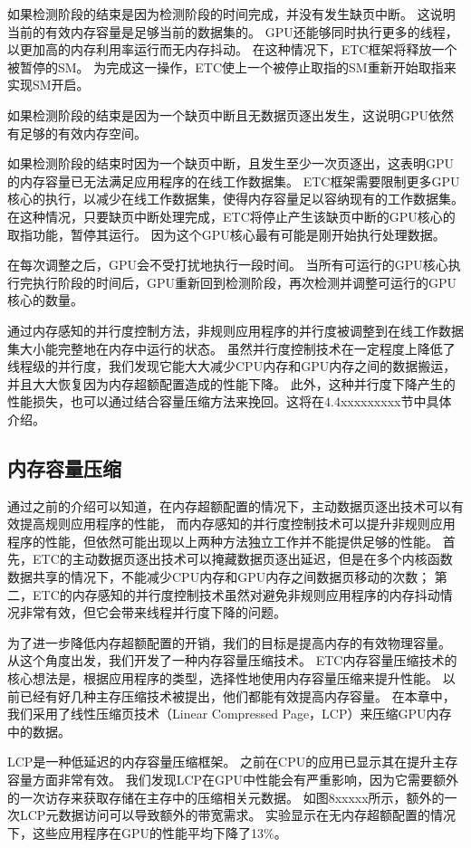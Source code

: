 如果检测阶段的结束是因为检测阶段的时间完成，并没有发生缺页中断。
这说明当前的有效内存容量是足够当前的数据集的。
GPU还能够同时执行更多的线程，以更加高的内存利用率运行而无内存抖动。
在这种情况下，ETC框架将释放一个被暂停的SM。
为完成这一操作，ETC使上一个被停止取指的SM重新开始取指来实现SM开启。

如果检测阶段的结束是因为一个缺页中断且无数据页逐出发生，这说明GPU依然有足够的有效内存空间。

如果检测阶段的结束时因为一个缺页中断，且发生至少一次页逐出，这表明GPU的内存容量已无法满足应用程序的在线工作数据集。
ETC框架需要限制更多GPU核心的执行，以减少在线工作数据集，使得内存容量足以容纳现有的工作数据集。
在这种情况，只要缺页中断处理完成，ETC将停止产生该缺页中断的GPU核心的取指功能，暂停其运行。
因为这个GPU核心最有可能是刚开始执行处理数据。

在每次调整之后，GPU会不受打扰地执行一段时间。
当所有可运行的GPU核心执行完执行阶段的时间后，GPU重新回到检测阶段，再次检测并调整可运行的GPU核心的数量。

通过内存感知的并行度控制方法，非规则应用程序的并行度被调整到在线工作数据集大小能完整地在内存中运行的状态。
虽然并行度控制技术在一定程度上降低了线程级的并行度，我们发现它能大大减少CPU内存和GPU内存之间的数据搬运，并且大大恢复因为内存超额配置造成的性能下降。
此外，这种并行度下降产生的性能损失，也可以通过结合容量压缩方法来挽回。这将在4.4xxxxxxxxx节中具体介绍。

\subsection{内存容量压缩}
通过之前的介绍可以知道，在内存超额配置的情况下，主动数据页逐出技术可以有效提高规则应用程序的性能，
而内存感知的并行度控制技术可以提升非规则应用程序的性能，但依然可能出现以上两种方法独立工作并不能提供足够的性能。
首先，ETC的主动数据页逐出技术可以掩藏数据页逐出延迟，但是在多个内核函数数据共享的情况下，不能减少CPU内存和GPU内存之间数据页移动的次数；
第二，ETC的内存感知的并行度控制技术虽然对避免非规则应用程序的内存抖动情况非常有效，但它会带来线程并行度下降的问题。

为了进一步降低内存超额配置的开销，我们的目标是提高内存的有效物理容量。
从这个角度出发，我们开发了一种内存容量压缩技术。
ETC内存容量压缩技术的核心想法是，根据应用程序的类型，选择性地使用内存容量压缩来提升性能。
以前已经有好几种主存压缩技术被提出，他们都能有效提高内存容量。
在本章中，我们采用了线性压缩页技术（Linear Compressed Page，LCP）来压缩GPU内存中的数据。

LCP是一种低延迟的内存容量压缩框架。
之前在CPU的应用已显示其在提升主存容量方面非常有效。
我们发现LCP在GPU中性能会有严重影响，因为它需要额外的一次访存来获取存储在主存中的压缩相关元数据。
如图8xxxxx所示，额外的一次LCP元数据访问可以导致额外的带宽需求。
实验显示在无内存超额配置的情况下，这些应用程序在GPU的性能平均下降了13\%。

